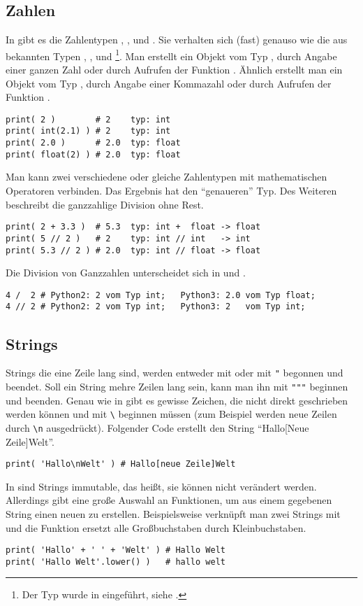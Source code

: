 \subsection{Zahlen}
\label{section:crashkurs:zahlen}
In \Python gibt es die Zahlentypen , ,  und .
Sie verhalten sich (fast) genauso wie die aus \CC bekannten Typen , ,  und %
\footnote{Der Typ  wurde in \CNeunundneunzig eingeführt, siehe \cite{C99}.}.
Man erstellt ein Objekt vom Typ , durch Angabe einer ganzen Zahl oder durch Aufrufen der Funktion .
Ähnlich erstellt man ein Objekt vom Typ , durch Angabe einer Kommazahl oder durch Aufrufen der Funktion .
\begin{lstlisting}
print( 2 )        # 2    typ: int
print( int(2.1) ) # 2    typ: int
print( 2.0 )      # 2.0  typ: float
print( float(2) ) # 2.0  typ: float
\end{lstlisting}
Man kann zwei verschiedene oder gleiche Zahlentypen mit mathematischen Operatoren verbinden.
Das Ergebnis hat den ``genaueren'' Typ.
Des Weiteren beschreibt \lpy{//} die ganzzahlige Division ohne Rest.
\begin{lstlisting}
print( 2 + 3.3 )  # 5.3  typ: int +  float -> float
print( 5 // 2 )   # 2    typ: int // int   -> int
print( 5.3 // 2 ) # 2.0  typ: int // float -> float
\end{lstlisting}
Die Division von Ganzzahlen unterscheidet sich in \PythonZwei und \PythonDrei.
\begin{lstlisting}
4 /  2 # Python2: 2 vom Typ int;   Python3: 2.0 vom Typ float;
4 // 2 # Python2: 2 vom Typ int;   Python3: 2   vom Typ int;
\end{lstlisting}


\subsection{Strings}
\label{section:crashkurs:strings}
Strings die eine Zeile lang sind, werden entweder mit  oder mit \lstinline[style=PyInline]|"| begonnen und beendet.
Soll ein String mehre Zeilen lang sein, kann man ihn mit \lstinline[style=PyInline]|"""| beginnen und beenden.
Genau wie in \CC gibt es gewisse Zeichen, die nicht direkt geschrieben werden können und mit \lstinline[language=C++,style=CPP]|\| beginnen müssen
(zum Beispiel werden neue Zeilen durch \lstinline[language=C++,style=CPP]|\n| ausgedrückt).
Folgender Code erstellt den String ``Hallo[Neue Zeile]Welt''.
\begin{lstlisting}
print( 'Hallo\nWelt' ) # Hallo[neue Zeile]Welt
\end{lstlisting}
In \Python sind Strings immutable, das heißt, sie können nicht verändert werden.
Allerdings gibt eine große Auswahl an Funktionen, um aus einem gegebenen String einen neuen zu erstellen.
Beispielsweise verknüpft man zwei Strings mit \lpy{+} und die Funktion  ersetzt alle Großbuchstaben durch Kleinbuchstaben.
\begin{lstlisting}
print( 'Hallo' + ' ' + 'Welt' ) # Hallo Welt
print( 'Hallo Welt'.lower() )   # hallo welt
\end{lstlisting}



